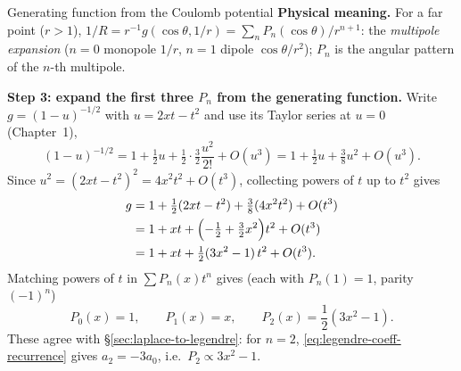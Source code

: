 \documentclass[11pt]{beamer}
\begin{document}
\begin{frame}[allowframebreaks=1.00]{Generating function from the Coulomb potential}
\textbf{Physical meaning.} For a far point ($r>1$), $1/R=r^{-1}g(\cos\theta,1/r)=\sum_n P_n(\cos\theta)/r^{n+1}$:
the \emph{multipole expansion} ($n=0$ monopole $1/r$, $n=1$ dipole $\cos\theta/r^2$);
$P_n$ is the angular pattern of the $n$-th multipole.

\textbf{Step 3: expand the first three $P_n$ from the generating function.}  Write
$g=(1-u)^{-1/2}$ with $u=2xt-t^2$ and use its Taylor series at $u=0$ (Chapter~1),
\[
  (1-u)^{-1/2}
    =1+\tfrac12 u+\tfrac12\cdot\tfrac32\frac{u^2}{2!}+O(u^3)
    =1+\tfrac12 u+\tfrac38 u^2+O(u^3).
\]
Since $u^2=(2xt-t^2)^2=4x^2t^2+O(t^3)$, collecting powers of $t$ up to $t^2$ gives
\begin{align*}
  g
    &=1+\tfrac12(2xt-t^2)+\tfrac38(4x^2t^2)+O(t^3)\\
    &=1+xt+\Bigl(-\tfrac12+\tfrac32 x^2\Bigr)t^2+O(t^3)\\
    &=1+xt+\tfrac12(3x^2-1)\,t^2+O(t^3).
\end{align*}
Matching powers of $t$ in $\sum P_n(x)t^n$ gives (each with $P_n(1)=1$, parity $(-1)^n$)
\begin{equation}
  P_0(x)=1,\qquad
  P_1(x)=x,\qquad
  P_2(x)=\frac12(3x^2-1).
  \label{eq:legendre-first-three}
\end{equation}
These agree with \S\ref{sec:laplace-to-legendre}: for $n=2$, \eqref{eq:legendre-coeff-recurrence}
gives $a_2=-3a_0$, i.e.\ $P_2\propto3x^2-1$.
\end{frame}
\end{document}

